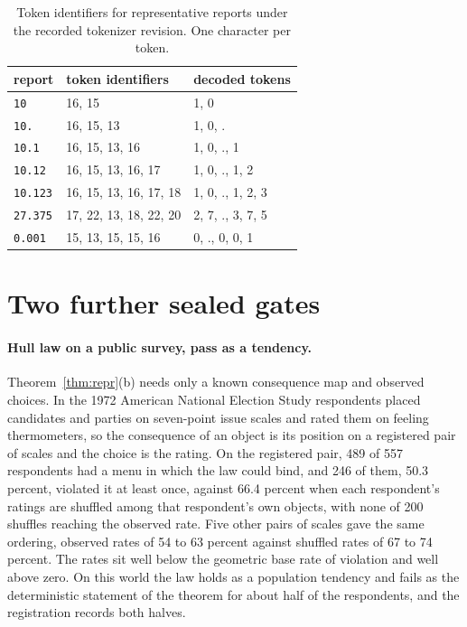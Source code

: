 \documentclass{article}
\theoremstyle{definition}
\theoremstyle{remark}
\begin{document}
\begin{table}[h]
\centering
\small
\caption{Token identifiers for representative reports under the recorded tokenizer revision. One character per token.}
\label{tab:tokens}
\begin{tabular}{lll}
\toprule
report & token identifiers & decoded tokens \\
\midrule
\texttt{10} & 16, 15 & 1, 0 \\
\texttt{10.} & 16, 15, 13 & 1, 0, . \\
\texttt{10.1} & 16, 15, 13, 16 & 1, 0, ., 1 \\
\texttt{10.12} & 16, 15, 13, 16, 17 & 1, 0, ., 1, 2 \\
\texttt{10.123} & 16, 15, 13, 16, 17, 18 & 1, 0, ., 1, 2, 3 \\
\texttt{27.375} & 17, 22, 13, 18, 22, 20 & 2, 7, ., 3, 7, 5 \\
\texttt{0.001} & 15, 13, 15, 15, 16 & 0, ., 0, 0, 1 \\
\bottomrule
\end{tabular}
\end{table}

\section{Two further sealed gates}
\label{app:gates}

\paragraph{Hull law on a public survey, pass as a tendency.}
Theorem~\ref{thm:repr}(b) needs only a known consequence map and observed choices.
In the 1972 American National Election Study respondents placed candidates and parties on seven-point issue scales and rated them on feeling thermometers, so the consequence of an object is its position on a registered pair of scales and the choice is the rating.
On the registered pair, 489 of 557 respondents had a menu in which the law could bind, and 246 of them, 50.3 percent, violated it at least once, against 66.4 percent when each respondent's ratings are shuffled among that respondent's own objects, with none of 200 shuffles reaching the observed rate.
Five other pairs of scales gave the same ordering, observed rates of 54 to 63 percent against shuffled rates of 67 to 74 percent.
The rates sit well below the geometric base rate of violation and well above zero.
On this world the law holds as a population tendency and fails as the deterministic statement of the theorem for about half of the respondents, and the registration records both halves.
\end{document}
